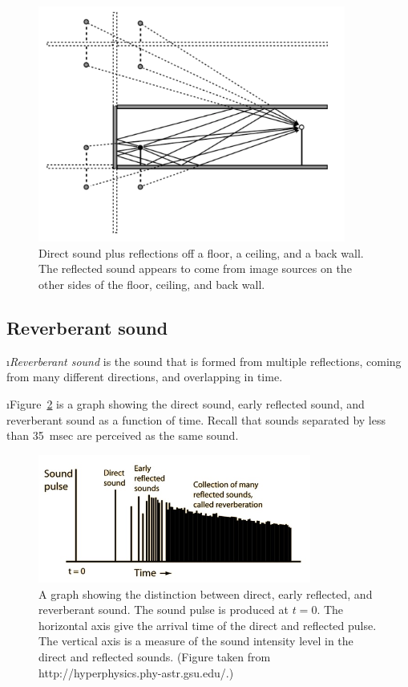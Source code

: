 %
%
\begin{figure}[htbp]
\begin{center}
\includegraphics[width=0.9\textwidth]{reflection_floor_wall_ceiling}
\caption{Direct sound plus reflections off a floor, a ceiling,
and a back wall. 
The reflected sound appears to come from image
sources on the other sides of the floor, ceiling, and back wall.}
\label{f:reflection_floor_wall_ceiling}
\end{center}
\end{figure}
%

\ei
\subsection{Reverberant sound}
\bi

\i {\em Reverberant sound} is the sound that is 
formed from multiple reflections, coming from many 
different directions, and overlapping in time.

\i Figure~\ref{f:reverb_time1} is a graph showing the
direct sound, early reflected sound, and reverberant
sound as a function of time.
Recall that sounds separated by less than 35~msec are
perceived as the same sound.
%
\begin{figure}[htbp]
\begin{center}
\includegraphics[width=0.8\textwidth]{reverb_time1}
\caption{
A graph showing the distinction between direct,
early reflected, and reverberant sound.
The sound pulse is produced at $t=0$.
The horizontal axis give the arrival time of the
direct and reflected pulse.
The vertical axis is a measure of the sound intensity
level in the direct and reflected sounds.
(Figure taken from  
{http://hyperphysics.phy-astr.gsu.edu/}.)}
\label{f:reverb_time1}
\end{center}
\end{figure}
%

